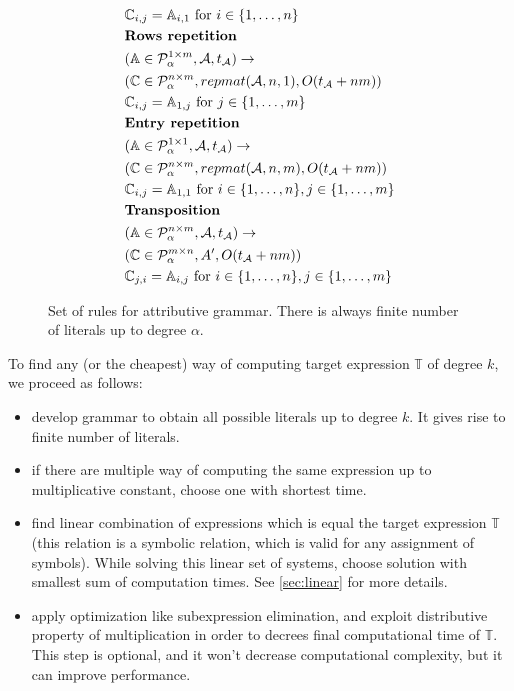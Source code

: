 \begin{figure}
\begin{framed}
\begin{align*}
&\mathbb{C}_{i, j} = \mathbb{A}_{i, 1} \text{ for } i \in \{1, \dots, n\}\\
&\text{{\bf Rows repetition}}\\
&(\mathbb{A} \in \mathcal{P}^{1 \times m}_\alpha, \mathcal{A}, t_\mathcal{A}) \rightarrow \\ 
&(\mathbb{C} \in \mathcal{P}^{n \times m}_\alpha, repmat(\mathcal{A}, n, 1), O(t_\mathcal{A} + nm)) \\
&\mathbb{C}_{i, j} = \mathbb{A}_{1, j} \text{ for } j \in \{1, \dots, m\}\\
&\text{{\bf Entry repetition}}\\
&(\mathbb{A} \in \mathcal{P}^{1 \times 1}_\alpha, \mathcal{A}, t_\mathcal{A}) \rightarrow \\ 
&(\mathbb{C} \in \mathcal{P}^{n \times m}_\alpha, repmat(\mathcal{A}, n, m), O(t_\mathcal{A} + nm)) \\
&\mathbb{C}_{i, j} = \mathbb{A}_{1, 1} \text{ for } i \in \{1, \dots, n\}, j \in \{1, \dots, m\}\\
&\text{{\bf Transposition}}\\
&(\mathbb{A} \in \mathcal{P}^{n \times m}_\alpha, \mathcal{A}, t_\mathcal{A}) \rightarrow \\ 
&(\mathbb{C} \in \mathcal{P}^{m \times n}_\alpha, A', O(t_\mathcal{A} + nm)) \\
&\mathbb{C}_{j, i} = \mathbb{A}_{i, j} \text{ for } i \in \{1, \dots, n\}, j \in \{1, \dots, m\} \\
\end{align*}
\caption{Set of rules for attributive grammar. There is always finite number of literals up to degree $\alpha$.}
\end{framed}
\label{rules}
\end{figure}


To find any (or the cheapest) way of computing target expression $\mathbb{T}$ of degree $k$, we proceed as follows: 
\begin{itemize}
\item develop grammar to obtain all possible literals up to degree $k$. It gives rise to finite number of literals. 
\item if there are multiple way of computing the same expression up to multiplicative constant, choose one with shortest time.
\item find linear combination of expressions which is equal the target
  expression $\mathbb{T}$ (this relation is a symbolic relation, which
  is valid for any assignment of symbols). While solving this linear
  set of systems, choose solution with smallest sum of computation
  times. See \ref{sec:linear} for more details.
\item apply optimization like subexpression elimination, and exploit distributive property of multiplication in order to decrees final computational time of $\mathbb{T}$. This step is optional, and it won't decrease computational complexity, but it can improve performance.
\end{itemize}


